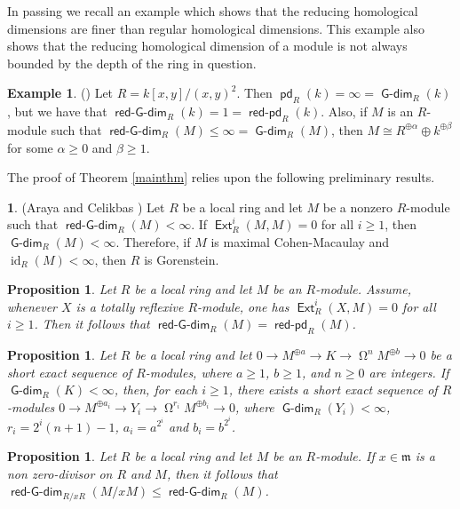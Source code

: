 \documentclass{amsart}
\theoremstyle{plain} %
\newtheorem{prop}[thm]{Proposition}
\theoremstyle{definition}
\newtheorem{chunk}[thm]{\hspace*{-1.065ex}\bf}
\newtheorem{eg}[thm]{Example}
\newcommand{\m}{\mathfrak{m}}
\DeclareMathOperator{\id}{id}
\def\Ext{\operatorname{\mathsf{Ext}}}
\def\pd{\operatorname{\mathsf{pd}}}
\DeclareMathOperator{\Gdim}{\mathsf{G-dim}}
\DeclareMathOperator{\rGdim}{\operatorname{\mathsf{red-G-dim}}}
\DeclareMathOperator{\rpdim}{\operatorname{\mathsf{red-pd}}}
\DeclareMathOperator{\syz}{\Omega}
\begin{document}

In passing we recall an example which shows that the reducing homological dimensions are finer than regular homological dimensions. This example also shows that the reducing homological dimension of a module is not always bounded by the depth of the ring in question.

\begin{eg} \label{exCA} (\cite[2.3]{CA}) Let $R=k[x,y]/(x,y)^2$. Then $\pd_R(k)=\infty=\Gdim_R(k)$, but we have that $\rGdim_R(k)=1=\rpdim_R(k)$. Also, if $M$ is an $R$-module such that $\rGdim_R(M)\leq \infty=\Gdim_R(M)$, then $M\cong R^{\oplus \alpha} \oplus k^{\oplus \beta}$ for some $\alpha\geq 0$ and $\beta \geq 1$.\pushQED{\qed} 
\qedhere
\popQED	
\end{eg}



The proof of Theorem \ref{mainthm} relies upon the following preliminary results. 

\begin{chunk} (Araya and Celikbas \cite[3.3(iii)]{CA}) \label{rGdimMCM} Let $R$ be a local ring and let $M$ be a nonzero $R$-module such that $\rGdim_R(M)<\infty$. If $\Ext^i_R(M,M)=0$ for all $i\geq 1$, then $\Gdim_R(M)<\infty$. Therefore, if $M$ is maximal Cohen-Macaulay and $\id_R(M)<\infty$, then $R$ is Gorenstein. \pushQED{\qed} 
\qedhere
\popQED	
\end{chunk}

\begin{prop} \label{app-prop} Let $R$ be a local ring and let $M$ be an $R$-module. Assume, whenever $X$ is a totally reflexive $R$-module, one has $\Ext^i_R(X, M)=0$ for all $i\geq 1$. Then it follows that $\rGdim_R(M)=\rpdim_R(M)$.
\end{prop}

\begin{prop} \label{p1} Let $R$ be a local ring and let $0\to M^{\oplus a} \to K \to \syz^{n} M^{\oplus b} \to 0$ be a short exact sequence of $R$-modules, where $a\geq 1$,  $b\geq 1$, and $n\geq 0$ are integers. If $\Gdim_R(K)<\infty$, then, for each $i\geq 1$, there exists a short exact sequence of $R$-modules $0\to M^{\oplus a_i} \to Y_i \to \syz^{r_i} M^{\oplus b_i} \to 0$, where $\Gdim_R(Y_i)<\infty$, $r_i=2^i(n+1)-1$, $a_i=a^{2^{i}}$ and $b_i=b^{2^{i}}$.
\end{prop}

\begin{prop} \label{mainprop} Let $R$ be a local ring and let $M$ be an $R$-module. If $x \in \m$ is a non zero-divisor on $R$ and $M$, then it follows that $\rGdim_{R/xR}(M/xM)\leq \rGdim_R(M)$.
\end{prop}
\end{document}
